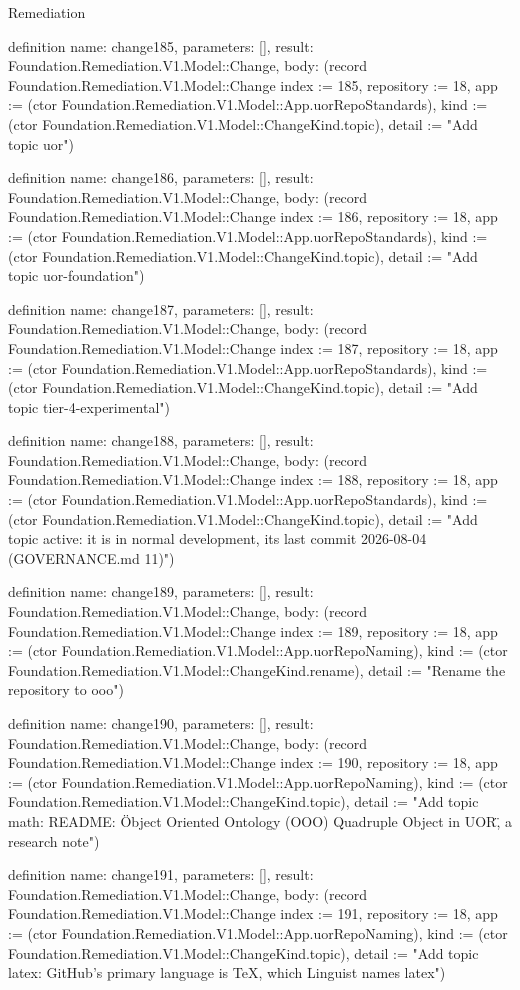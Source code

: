 \begin{lexlean}{Remediation}
\begin{semanticmodule}
definition{
  name: change185,
  parameters: [],
  result: Foundation.Remediation.V1.Model::Change,
  body: (record Foundation.Remediation.V1.Model::Change {index := 185, repository := 18, app := (ctor Foundation.Remediation.V1.Model::App.uorRepoStandards), kind := (ctor Foundation.Remediation.V1.Model::ChangeKind.topic), detail := "Add topic uor"})
}

definition{
  name: change186,
  parameters: [],
  result: Foundation.Remediation.V1.Model::Change,
  body: (record Foundation.Remediation.V1.Model::Change {index := 186, repository := 18, app := (ctor Foundation.Remediation.V1.Model::App.uorRepoStandards), kind := (ctor Foundation.Remediation.V1.Model::ChangeKind.topic), detail := "Add topic uor-foundation"})
}

definition{
  name: change187,
  parameters: [],
  result: Foundation.Remediation.V1.Model::Change,
  body: (record Foundation.Remediation.V1.Model::Change {index := 187, repository := 18, app := (ctor Foundation.Remediation.V1.Model::App.uorRepoStandards), kind := (ctor Foundation.Remediation.V1.Model::ChangeKind.topic), detail := "Add topic tier-4-experimental"})
}

definition{
  name: change188,
  parameters: [],
  result: Foundation.Remediation.V1.Model::Change,
  body: (record Foundation.Remediation.V1.Model::Change {index := 188, repository := 18, app := (ctor Foundation.Remediation.V1.Model::App.uorRepoStandards), kind := (ctor Foundation.Remediation.V1.Model::ChangeKind.topic), detail := "Add topic active: it is in normal development, its last commit 2026-08-04 (GOVERNANCE.md 11)"})
}

definition{
  name: change189,
  parameters: [],
  result: Foundation.Remediation.V1.Model::Change,
  body: (record Foundation.Remediation.V1.Model::Change {index := 189, repository := 18, app := (ctor Foundation.Remediation.V1.Model::App.uorRepoNaming), kind := (ctor Foundation.Remediation.V1.Model::ChangeKind.rename), detail := "Rename the repository to ooo"})
}

definition{
  name: change190,
  parameters: [],
  result: Foundation.Remediation.V1.Model::Change,
  body: (record Foundation.Remediation.V1.Model::Change {index := 190, repository := 18, app := (ctor Foundation.Remediation.V1.Model::App.uorRepoNaming), kind := (ctor Foundation.Remediation.V1.Model::ChangeKind.topic), detail := "Add topic math: README: \"Object Oriented Ontology (OOO) Quadruple Object in UOR\", a research note"})
}

definition{
  name: change191,
  parameters: [],
  result: Foundation.Remediation.V1.Model::Change,
  body: (record Foundation.Remediation.V1.Model::Change {index := 191, repository := 18, app := (ctor Foundation.Remediation.V1.Model::App.uorRepoNaming), kind := (ctor Foundation.Remediation.V1.Model::ChangeKind.topic), detail := "Add topic latex: GitHub's primary language is TeX, which Linguist names latex"})
}


\end{semanticmodule}
\end{lexlean}
